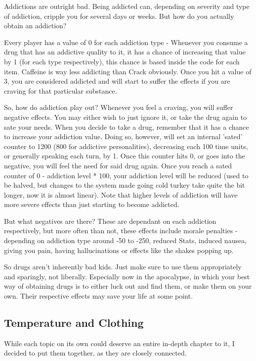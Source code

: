 \documentclass[11pt]{report}
\begin{document}
Addictions are outright bad. Being addicted can, depending on severity and type of addiction, cripple you for several days or weeks. But how do you actually obtain an addiction?

Every player has a value of 0 for each addiction type - Whenever you consume a drug that has an addictive quality to it, it has a chance of increasing that value by 1 (for each type respectively), this chance is based inside the code for each item. Caffeine is way less addicting than Crack obviously. Once you hit a value of 3, you are considered addicted and will start to suffer the effects if you are craving for that particular substance.

So, how do addiction play out? Whenever you feel a craving, you will suffer negative effects. You may either wish to just ignore it, or take the drug again to sate your needs. When you decide to take a drug, remember that it has a chance to increase your addiction value. Doing so, however, will set an internal 'sated' counter to 1200 (800 for addictive personalities), decreasing each 100 time units, or generally speaking each turn, by 1. Once this counter hits 0, or goes into the negative, you will feel the need for said drug again.
Once you reach a sated counter of 0 - addiction level * 100, your addiction level will be reduced (used to be halved, but changes to the system made going cold turkey take quite the bit longer, now it is almost linear). Note that higher levels of addiction will have more severe effects than just starting to become addicted.

But what negatives are there? These are dependant on each addiction respectively, but more often than not, these effects include morale penalties - depending on addiction type around -50 to -250, reduced Stats, induced nausea, giving you pain, having hallucinations or effects like the shakes popping up.

So drugs aren't inherently bad kids. Just make sure to use them appropriately and sparingly, not liberally. Especially now in the apocalypse, in which your best way of obtaining drugs is to either luck out and find them, or make them on your own. Their respective effects may save your life at some point.


\subsection{Temperature and Clothing}

While each topic on its own could deserve an entire in-depth chapter to it, I decided to put them together, as they are closely connected.
\end{document}
